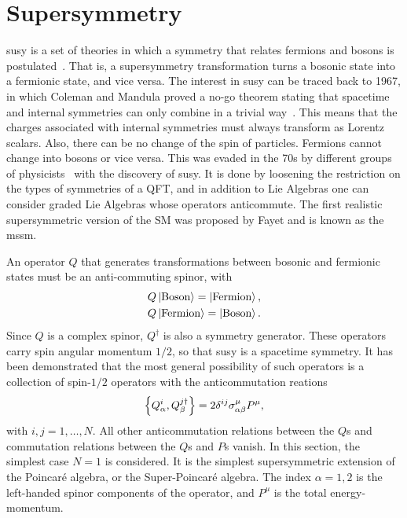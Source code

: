 \clearpage
\section{Supersymmetry}

\gls{susy} is a set of theories in which a symmetry that relates fermions and bosons is postulated~\cite{Peskin2019-bt,Garrett_2011,MARTIN_1998}. That is, a supersymmetry transformation turns a bosonic state into a fermionic state, and vice versa. The interest in \gls{susy} can be traced back to 1967, in which Coleman and Mandula proved a no-go theorem stating that spacetime and internal symmetries can only combine in a trivial way~\cite{PhysRev.159.1251}. This means that the charges associated with internal symmetries must always transform as Lorentz scalars. Also, there can be no change of the spin of particles. Fermions cannot change into bosons or vice versa. This was evaded in the 70s by different groups of physicists~\cite{GERVAIS1971632,HAAG1975257} with the discovery of \gls{susy}. It is done by loosening the restriction on the types of symmetries of a QFT, and in addition to Lie Algebras one can consider graded Lie Algebras whose operators anticommute. The first realistic supersymmetric version of the SM was proposed by Fayet and is known as the \gls{mssm}.

An operator $Q$ that generates transformations between bosonic and fermionic states must be an anti-commuting spinor, with
\begin{equation}
\begin{split}
Q\ket{\text{Boson}}=\ket{\text{Fermion}},\\
Q\ket{\text{Fermion}}=\ket{\text{Boson}}.
\end{split}
\end{equation}
Since $Q$ is a complex spinor, $Q^\dagger$ is also a symmetry generator. These operators carry spin angular momentum $1/2$, so that \gls{susy} is a spacetime symmetry. It has been demonstrated that the most general possibility of such operators is a collection of spin-$1/2$ operators with the anticommutation reations
\begin{equation}
\pb{Q^i_\alpha}{Q^{j\dagger}_\beta}=2\delta^{ij}\sigma^\mu_{\alpha\beta}P^\mu,
\end{equation}
with $i,j=1,\ldots,N$. All other anticommutation relations between the $Q$s and commutation relations between the $Q$s and $P$s vanish. In this section, the simplest case $N=1$ is considered. It is the simplest supersymmetric extension of the Poincaré algebra, or the Super-Poincaré algebra. The index $\alpha=1,2$ is the left-handed spinor components of the operator, and $P^\mu$ is the total energy-momentum. 

